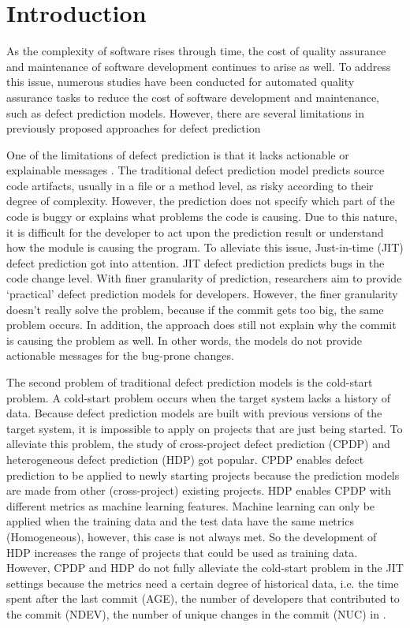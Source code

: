 \section{Introduction}
As the complexity of software rises through time, the cost of quality assurance and maintenance of software development continues to arise as well.
To address this issue, numerous studies have been conducted for automated quality assurance tasks to reduce the cost of software development and maintenance, such as defect prediction models.
However, there are several limitations in previously proposed approaches for defect prediction 

One of the limitations of defect prediction is that it lacks actionable or explainable messages \cite{lewis2013does}.
The traditional defect prediction model predicts source code artifacts, usually in a file or a method level, as risky according to their degree of complexity.
However, the prediction does not specify which part of the code is buggy or explains what problems the code is causing. 
Due to this nature, it is difficult for the developer to act upon the prediction result or understand how the module is causing the program.
To alleviate this issue, Just-in-time (JIT) defect prediction got into attention.
JIT defect prediction predicts bugs in the code change level.
With finer granularity of prediction, researchers aim to provide `practical' defect prediction models for developers.
However, the finer granularity doesn't really solve the problem, because if the commit gets too big, the same problem occurs. In addition, the approach does still not explain why the commit is causing the problem as well. In other words, the models do not provide actionable messages for the bug-prone changes.

The second problem of traditional defect prediction models is the cold-start problem. 
A cold-start problem occurs when the target system lacks a history of data. 
Because defect prediction models are built with previous versions of the target system, it is impossible to apply on projects that are just being started.
To alleviate this problem, the study of cross-project defect prediction (CPDP) and heterogeneous defect prediction (HDP) got popular. 
CPDP enables defect prediction to be applied to newly starting projects because the prediction models are made from other (cross-project) existing projects.
HDP enables CPDP with different metrics as machine learning features.
Machine learning can only be applied when the training data and the test data have the same metrics (Homogeneous), however, this case is not always met.
So the development of HDP increases the range of projects that could be used as training data.
However, CPDP and HDP do not fully alleviate the cold-start problem in the JIT settings because the metrics need a certain degree of historical data, i.e. the time spent after the last commit (AGE), the number of developers that contributed to the commit (NDEV), the number of unique changes in the commit (NUC) in \cite{kamei2012large}.

